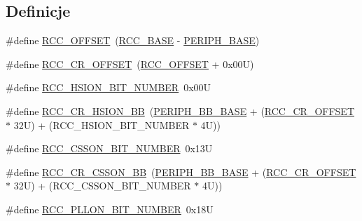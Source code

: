 \subsection*{Definicje}
\begin{DoxyCompactItemize}
\item 
\#define \hyperlink{group___r_c_c___bit_address___alias_region_ga539e07c3b3c55f1f1d47231341fb11e1}{R\+C\+C\+\_\+\+O\+F\+F\+S\+ET}~(\hyperlink{group___peripheral__memory__map_ga0e681b03f364532055d88f63fec0d99d}{R\+C\+C\+\_\+\+B\+A\+SE} -\/ \hyperlink{group___peripheral__memory__map_ga9171f49478fa86d932f89e78e73b88b0}{P\+E\+R\+I\+P\+H\+\_\+\+B\+A\+SE})
\item 
\#define \hyperlink{group___r_c_c___bit_address___alias_region_ga6df8d81c05c07cb0c26bbf27ea7fe55c}{R\+C\+C\+\_\+\+C\+R\+\_\+\+O\+F\+F\+S\+ET}~(\hyperlink{group___r_c_c___bit_address___alias_region_ga539e07c3b3c55f1f1d47231341fb11e1}{R\+C\+C\+\_\+\+O\+F\+F\+S\+ET} + 0x00\+U)
\item 
\#define \hyperlink{group___r_c_c___bit_address___alias_region_ga9bf60daa74224ea82d3df7e08d4533f1}{R\+C\+C\+\_\+\+H\+S\+I\+O\+N\+\_\+\+B\+I\+T\+\_\+\+N\+U\+M\+B\+ER}~0x00U
\item 
\#define \hyperlink{group___r_c_c___bit_address___alias_region_gabd3eca3cc8b1501f9d8a62c4a0ebcfe7}{R\+C\+C\+\_\+\+C\+R\+\_\+\+H\+S\+I\+O\+N\+\_\+\+BB}~(\hyperlink{group___peripheral__memory__map_gaed7efc100877000845c236ccdc9e144a}{P\+E\+R\+I\+P\+H\+\_\+\+B\+B\+\_\+\+B\+A\+SE} + (\hyperlink{group___r_c_c___bit_address___alias_region_ga6df8d81c05c07cb0c26bbf27ea7fe55c}{R\+C\+C\+\_\+\+C\+R\+\_\+\+O\+F\+F\+S\+ET} $\ast$ 32\+U) + (\+R\+C\+C\+\_\+\+H\+S\+I\+O\+N\+\_\+\+B\+I\+T\+\_\+\+N\+U\+M\+B\+E\+R $\ast$ 4\+U))
\item 
\#define \hyperlink{group___r_c_c___bit_address___alias_region_gaa8a1695db870d271a9e79bf0272ec8b6}{R\+C\+C\+\_\+\+C\+S\+S\+O\+N\+\_\+\+B\+I\+T\+\_\+\+N\+U\+M\+B\+ER}~0x13U
\item 
\#define \hyperlink{group___r_c_c___bit_address___alias_region_ga37c353c62ad303e661e99f20dcc6d1f0}{R\+C\+C\+\_\+\+C\+R\+\_\+\+C\+S\+S\+O\+N\+\_\+\+BB}~(\hyperlink{group___peripheral__memory__map_gaed7efc100877000845c236ccdc9e144a}{P\+E\+R\+I\+P\+H\+\_\+\+B\+B\+\_\+\+B\+A\+SE} + (\hyperlink{group___r_c_c___bit_address___alias_region_ga6df8d81c05c07cb0c26bbf27ea7fe55c}{R\+C\+C\+\_\+\+C\+R\+\_\+\+O\+F\+F\+S\+ET} $\ast$ 32\+U) + (\+R\+C\+C\+\_\+\+C\+S\+S\+O\+N\+\_\+\+B\+I\+T\+\_\+\+N\+U\+M\+B\+E\+R $\ast$ 4\+U))
\item 
\#define \hyperlink{group___r_c_c___bit_address___alias_region_gaed4c77e51cc821b9645cb7874bf5861b}{R\+C\+C\+\_\+\+P\+L\+L\+O\+N\+\_\+\+B\+I\+T\+\_\+\+N\+U\+M\+B\+ER}~0x18U

\end{DoxyCompactItemize}

